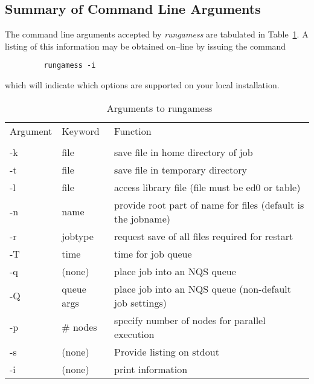 \documentclass[11pt,fleqn]{article}
\begin{document}
\subsection[Summary of Command Line Arguments]{Summary of Command Line Arguments}

 The command line arguments accepted by {\em rungamess} are tabulated in  Table~\ref{table:2}.
A listing of this information may be obtained on--line by issuing the command

{
\footnotesize
\begin{verbatim}
         rungamess -i
\end{verbatim}
}
which will indicate which options are supported on your local installation.

\begin{table}
 \caption{\label{table:2}\ Arguments to rungamess}
 
 \begin{centering}
 \begin{tabular}{lll}
\\ \hline\hline
Argument   &  Keyword &  Function \\ \cline{1-3}
\\
 -k  & file    &  save file in home directory of job \\
 -t  & file    &  save file in temporary directory \\
 -l  & file    &  access library file (file must be ed0 or table)\\
 -n  & name    &  provide root part of name for files (default is the jobname) \\
 -r  & jobtype &  request save of all files required for restart \\
 -T  & time    &  time for job queue \\
 -q  & (none)  &  place job into an NQS queue \\
 -Q  & queue args &  place job into an NQS queue (non-default job settings) \\
 -p  & \# nodes &  specify number of nodes for parallel execution \\
 -s  & (none)  &  Provide listing on stdout \\
 -i  & (none)  & print information \\
\hline\hline
 \end{tabular}
 
 \end{centering}
\end{table}
\end{document}
